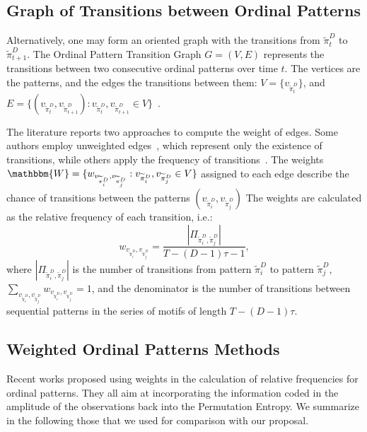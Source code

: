 \documentclass[journal]{IEEEtran}
\begin{document}
\subsection{Graph of Transitions between Ordinal Patterns}\label{OPTG}

Alternatively, one may form an oriented graph with the transitions from $\widetilde\pi_t^D$ to $\widetilde\pi_{t+1}^D$. 
The Ordinal Pattern Transition Graph ${G} = ({V}, {E})$ 
represents the transitions between two consecutive ordinal patterns over time $t$.
The vertices are the patterns, and the edges the transitions between them:
$V = \{v_{\widetilde\pi_t^D}\}$, and 
$E = \{(v_{\widetilde\pi_t^D}, v_{\widetilde\pi_{t+1}^D}): v_{\widetilde\pi_t^D}, v_{\widetilde\pi_{t+1}^D} \in V \}$~\cite{Borges2019Transition}.

The literature reports two approaches to compute the weight of edges.
Some authors employ unweighted edges~\cite{McCullough2015lagged, Kulp2016ordinal}, which represent only the existence of transitions, while others apply the frequency of transitions~\cite{Sorrentino2015periodic, Zhang2017ConstructingOP}.
The weights $\mathbbm{W} = \{w_{v_{\widetilde{\pi}^D_i}, v_{\widetilde\pi^D_j}}: v_{\widetilde\pi^D_i}, v_{\widetilde\pi^D_j} \in V \}$ assigned to each edge describe the chance of transitions between the patterns $(v_{\widetilde\pi^D_i}, v_{\widetilde\pi^D_j})$
The weights are calculated as the relative frequency of each transition, i.e.:
\begin{equation}
w_{v_{\widetilde\pi^D_i}, v_{\widetilde\pi^D_j}} = \frac{|\Pi_{\widetilde\pi^D_i,\widetilde\pi^D_j}|}{T-(D-1)\tau-1},
\end{equation}
where $|\Pi_{\widetilde\pi^D_i,\widetilde\pi^D_j}|$ is the number of transitions from pattern $\widetilde\pi^D_i$ to pattern $\widetilde\pi^D_j$, $\sum_{v_{\widetilde\pi^D_i}, v_{\widetilde\pi^D_j}}w_{v_{\widetilde\pi^D_i}, v_{\widetilde\pi^D_j}} = 1$,
and the denominator is the number of transitions between sequential patterns in the series of motifs of length $T-(D-1)\tau$.

\subsection{Weighted Ordinal Patterns Methods}\label{Methods}

Recent works proposed using weights in the calculation of relative frequencies for ordinal patterns.
They all aim at incorporating the information coded in the amplitude of the observations back into the Permutation Entropy.
We summarize in the following those that we used for comparison with our proposal.
\end{document}
